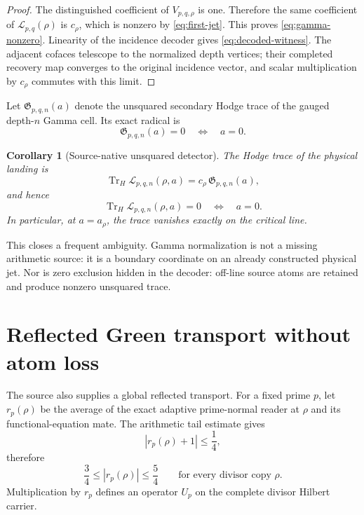 \documentclass[11pt]{article}
\newtheorem{corollary}[theorem]{Corollary}
\theoremstyle{definition}
\theoremstyle{remark}
\begin{document}
\begin{proof}
The distinguished coefficient of \(V_{p,q,\rho}\) is one.  Therefore the
same coefficient of \(\mathcal L_{p,q}(\rho)\) is \(c_\rho\), which is
nonzero by \eqref{eq:first-jet}.  This proves \eqref{eq:gamma-nonzero}.
Linearity of the incidence decoder gives \eqref{eq:decoded-witness}.
The adjacent cofaces telescope to the normalized depth vertices; their
completed recovery map converges to the original incidence vector, and
scalar multiplication by \(c_\rho\) commutes with this limit.
\end{proof}

Let \(\mathfrak G_{p,q,n}(a)\) denote the unsquared secondary Hodge trace of
the gauged depth-\(n\) Gamma cell.  Its exact radical is
\[
                 \mathfrak G_{p,q,n}(a)=0
                 \quad\Longleftrightarrow\quad a=0.
\tag{4.4}\label{eq:hodge-radical}
\]

\begin{corollary}[Source-native unsquared detector]
\label{cor:unsquared-detector}
The Hodge trace of the physical landing is
\[
 \operatorname{Tr}_{H}\mathcal L_{p,q,n}(\rho,a)
 =c_\rho\,\mathfrak G_{p,q,n}(a),
\tag{4.5}\label{eq:joined-trace}
\]
and hence
\[
 \operatorname{Tr}_{H}\mathcal L_{p,q,n}(\rho,a)=0
 \quad\Longleftrightarrow\quad a=0.
\tag{4.6}\label{eq:joined-radical}
\]
In particular, at \(a=a_\rho\), the trace vanishes exactly on the critical
line.
\end{corollary}

This closes a frequent ambiguity.  Gamma normalization is not a missing
arithmetic source: it is a boundary coordinate on an already constructed
physical jet.  Nor is zero exclusion hidden in the decoder: off-line source
atoms are retained and produce nonzero unsquared trace.

\section{Reflected Green transport without atom loss}

The source also supplies a global reflected transport.  For a fixed prime
\(p\), let \(r_p(\rho)\) be the average of the exact adaptive prime-normal
reader at \(\rho\) and its functional-equation mate.  The arithmetic tail
estimate gives
\[
             |r_p(\rho)+1|\leq\frac14,
\tag{5.1}\label{eq:reader-quarter}
\]
therefore
\[
       \frac34\leq |r_p(\rho)|\leq\frac54
       \qquad\text{for every divisor copy }\rho.
\tag{5.2}\label{eq:reader-bounds}
\]
Multiplication by \(r_p\) defines an operator \(U_p\) on the complete
divisor Hilbert carrier.
\end{document}
